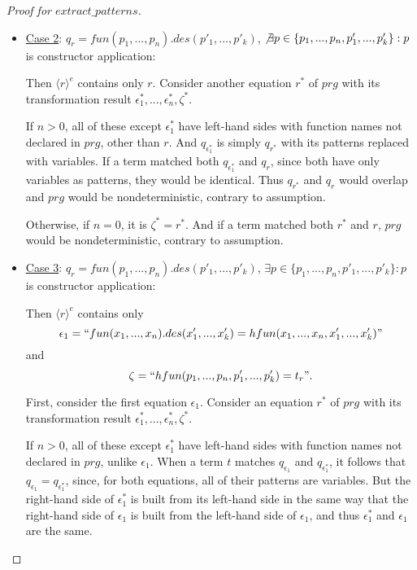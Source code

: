 \documentclass[11pt]{article} %
\begin{document}
\begin{proof}[Proof for $extract\_patterns$]
\begin{itemize}
\item \underline{Case 2}: $q_r = fun(p_1, ..., p_n).des(p'_1, ..., p'_k)$, $\not\exists p \in \{ p_1, ..., p_n, p'_1, ..., p'_k \}: p$ is constructor application:

Then $\langle r \rangle^e$ contains only $r$. Consider another equation $r^*$ of $prg$ with its transformation result $\epsilon^*_1, ..., \epsilon^*_n, \zeta^*$.

If $n > 0$, all of these except $\epsilon^*_1$ have left-hand sides with function names not declared in $prg$, other than $r$. And $q_{\epsilon^*_1}$ is simply $q_{r^*}$ with its patterns replaced with variables. If a term matched both $q_{\epsilon^*_1}$ and $q_r$, since both have only variables as patterns, they would be identical. Thus $q_{r^*}$ and $q_r$ would overlap and $prg$ would be nondeterministic, contrary to assumption.

Otherwise, if $n = 0$, it is $\zeta^* = r^*$. And if a term matched both $r^*$ and $r$, $prg$ would be nondeterministic, contrary to assumption.

\item \underline{Case 3}: $q_r = fun(p_1, ..., p_n).des(p'_1, ..., p'_k)$, $\exists p \in \{ p_1, ..., p_n, p'_1, ..., p'_k \}: p$ is constructor application:

Then $\langle r \rangle^e$ contains only
\begin{equation*}
\epsilon_1 = ``fun(x_1, ..., x_n).des(x'_1, ..., x'_k) = hfun(x_1, ..., x_n, x'_1, ..., x'_k)"
\end{equation*}
and
\begin{equation*}
\zeta = ``hfun(p_1, ..., p_n, p'_1, ..., p'_k) = t_r".
\end{equation*}

First, consider the first equation $\epsilon_1$. Consider an equation $r^*$ of $prg$ with its transformation result $\epsilon^*_1, ..., \epsilon^*_n, \zeta^*$.

If $n > 0$, all of these except $\epsilon^*_1$ have left-hand sides with function names not declared in $prg$, unlike $\epsilon_1$. When a term $t$ matches $q_{\epsilon_1}$ and $q_{\epsilon^*_1}$, it follows that $q_{\epsilon_1} = q_{\epsilon^*_1}$, since, for both equations, all of their patterns are variables. But the right-hand side of $\epsilon^*_1$ is built from its left-hand side in the same way that the right-hand side of $\epsilon_1$ is built from the left-hand side of $\epsilon_1$, and thus $\epsilon^*_1$ and $\epsilon_1$ are the same.


\end{itemize}
\end{proof}
\end{document}
